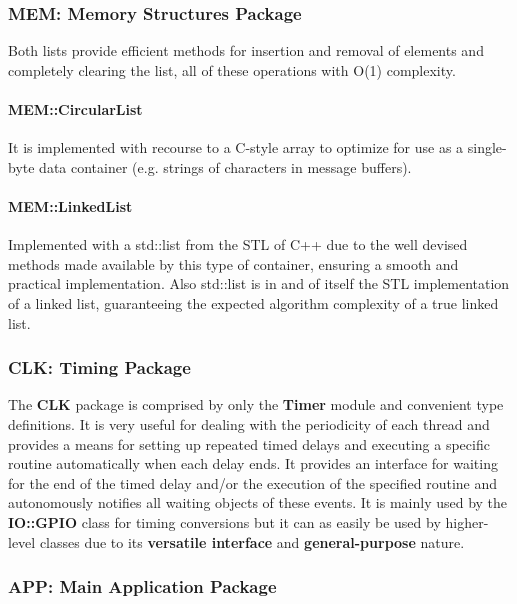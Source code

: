 \subsubsection{MEM: Memory Structures Package}

Both lists provide efficient methods for insertion and removal of elements and completely clearing the list, all of these operations with O(1) complexity.

\paragraph{MEM::CircularList}
It is implemented with recourse to a C-style array to optimize for use as a single-byte data container (e.g. strings of characters in message buffers).

\paragraph{MEM::LinkedList}
Implemented with a std::list from the STL of C++ due to the well devised methods made available by this type of container, ensuring a smooth and practical implementation. Also std::list is in and of itself the STL implementation of a linked list, guaranteeing the expected algorithm complexity of a true linked list.
%
\subsubsection{CLK: Timing Package}
The \textbf{CLK} package is comprised by only the \textbf{Timer} module and convenient type definitions. It is very useful for dealing with the periodicity of each thread and provides a means for setting up repeated timed delays and executing a specific routine automatically when each delay ends. It provides an interface for waiting for the end of the timed delay and/or the execution of the specified routine and autonomously notifies all waiting objects of these events.
It is mainly used by the \textbf{IO::GPIO} class for timing conversions but it can as easily be used by higher-level classes due to its \textbf{versatile interface} and \textbf{general-purpose} nature.
%

%
\subsubsection{APP: Main Application Package}
%